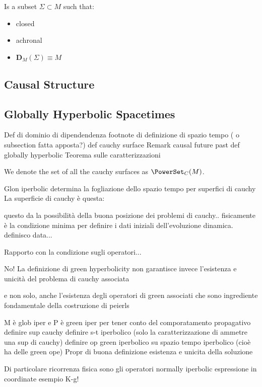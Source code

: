 \documentclass[Main]{subfiles}
\begin{document}
	\begin{definition}
		Is a subset $\Sigma \subset M$ such that:
		\begin{itemize}
			\item closed
			\item achronal
			\item $\mathbf{D}_M(\Sigma) \equiv M$
		\end{itemize}
	\end{definition}

		\subsection{Causal Structure}
		
		\subsection{Globally Hyperbolic Spacetimes}

			\begin{Warning}
			Def di dominio di dipendendenza
			footnote di definizione di spazio tempo ( o subsection fatta apposta?)
			def cauchy surface
			Remark causal future past
			def globally hyperbolic
			Teorema sulle caratterizzazioni
			\end{Warning}			
			
			\begin{notationfix}
				We denote the set of all the cauchy surfaces as $\PowerSet_{C}(M)$.
			\end{notationfix}
					

		Glon iperbolic determina la fogliazione dello spazio tempo per superfici di cauchy
		La superficie di cauchy è questa:
		\begin{definition}
		\end{definition}		
		questo da la possibilità della buona posizione dei problemi di cauchy.. fisicamente è la condizione minima per definire i dati iniziali dell'evoluzione dinamica.
		definisco data...
						
		\begin{Warning}
		Rapporto con la condizione sugli operatori...		
		
				
	No!		La definizione di green hyperbolicity non garantisce invece l'esistenza e unicità del problema di cauchy associata
		
		e non solo, anche l'esistenza degli operatori di green associati che sono ingrediente fondamentale della costruzione di peierls

		M è glob iper e P è green iper per tener conto del comporatamento propagativo
		definire sup cauchy
		definire s-t iperbolico (solo la caratterizzazione di ammetre una sup di cauchy)
		definire op green iperbolico su spazio tempo iperbolico (cioè ha delle green ope)
		Propr di buona definizione esistenza e unicita della soluzione
		
		Di particolare ricorrenza fisica sono gli operatori normally iperbolic
		espressione in coordinate
		esempio K-g!
		\end{Warning}						
		
\end{document}
